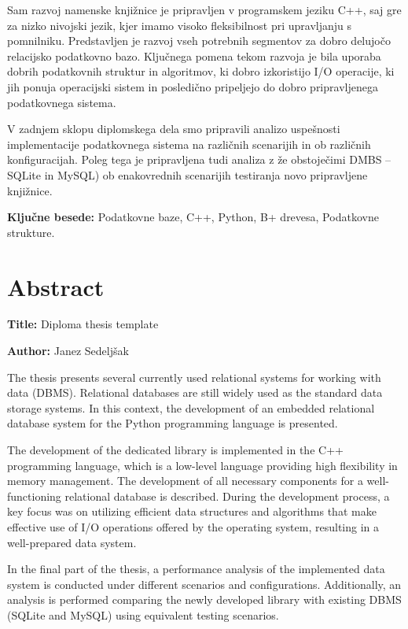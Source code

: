 \documentclass[a4paper,12pt,openright]{book}
\newcommand{\ttitleEn}{Diploma thesis template}
\newcommand{\tauthor}{Janez Sedeljšak}
\newcommand{\tkeywords}{Podatkovne baze, C++, Python, B+ drevesa, Podatkovne strukture}
\newcommand{\clearemptydoublepage}{\newpage{\pagestyle{empty}\cleardoublepage}}
\begin{document}
Sam razvoj namenske knjižnice je pripravljen v programskem jeziku C++, saj gre za nizko nivojski jezik, kjer imamo visoko fleksibilnost pri upravljanju s pomnilniku. Predstavljen je razvoj vseh potrebnih segmentov za dobro delujočo relacijsko podatkovno bazo. Ključnega pomena tekom razvoja je bila uporaba dobrih podatkovnih struktur in algoritmov, ki dobro izkoristijo I/O operacije, ki jih ponuja operacijski sistem in posledično pripeljejo do dobro pripravljenega podatkovnega sistema.

V zadnjem sklopu diplomskega dela smo pripravili analizo uspešnosti implementacije podatkovnega sistema na različnih scenarijih in ob različnih konfiguracijah. Poleg tega je pripravljena tudi analiza z že obstoječimi DMBS – SQLite in MySQL) ob enakovrednih scenarijih testiranja novo pripravljene knjižnice.
\bigskip

\noindent\textbf{Ključne besede:} \tkeywords.
\clearemptydoublepage

{}
\chapter*{Abstract}

\noindent\textbf{Title:} \ttitleEn
\bigskip

\noindent\textbf{Author:} \tauthor
\bigskip

\noindent The thesis presents several currently used relational systems for working with data (DBMS). Relational databases are still widely used as the standard data storage systems. In this context, the development of an embedded relational database system for the Python programming language is presented.

The development of the dedicated library is implemented in the C++ programming language, which is a low-level language providing high flexibility in memory management. The development of all necessary components for a well-functioning relational database is described. During the development process, a key focus was on utilizing efficient data structures and algorithms that make effective use of I/O operations offered by the operating system, resulting in a well-prepared data system.

In the final part of the thesis, a performance analysis of the implemented data system is conducted under different scenarios and configurations. Additionally, an analysis is performed comparing the newly developed library with existing DBMS (SQLite and MySQL) using equivalent testing scenarios.
\bigskip
\end{document}
